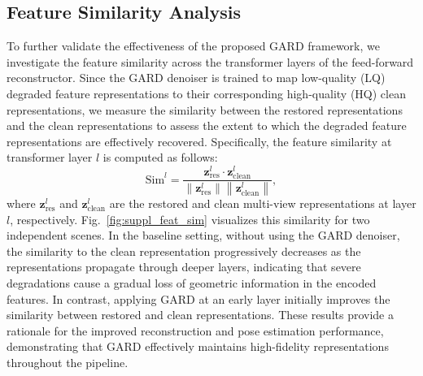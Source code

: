 \documentclass{llmxive}
\begin{document}
\subsection{Feature Similarity Analysis}
To further validate the effectiveness of the proposed GARD framework, we investigate the feature similarity across the transformer layers of the feed-forward reconstructor. Since the GARD denoiser is trained to map low-quality (LQ) degraded feature representations to their corresponding high-quality (HQ) clean representations, we measure the similarity between the restored representations and the clean representations to assess the extent to which the degraded feature representations are effectively recovered. Specifically, the feature similarity at transformer layer $l$ is computed as follows:
\begin{equation}
\mathrm{Sim}^{l} = 
\frac{
\mathbf{z}_{\text{res}}^{l}
\cdot 
\mathbf{z}_{\text{clean}}^{l}
}{
\left\lVert \mathbf{z}_{\text{res}}^{l} \right\rVert
\left\lVert \mathbf{z}_{\text{clean}}^{l} \right\rVert
},
\end{equation}
where $\mathbf{z}_{\text{res}}^{l}$ and $\mathbf{z}_{\text{clean}}^{l}$ are the restored and clean multi-view representations at layer $l$, respectively. Fig.~\ref{fig:suppl_feat_sim} visualizes this similarity for two independent scenes. In the baseline setting, without using the GARD denoiser, the similarity to the clean representation progressively decreases as the representations propagate through deeper layers, indicating that severe degradations cause a gradual loss of geometric information in the encoded features. In contrast, applying GARD at an early layer initially improves the similarity between restored and clean representations. These results provide a rationale for the improved reconstruction and pose estimation performance, demonstrating that GARD effectively maintains high-fidelity representations throughout the pipeline.
\end{document}
